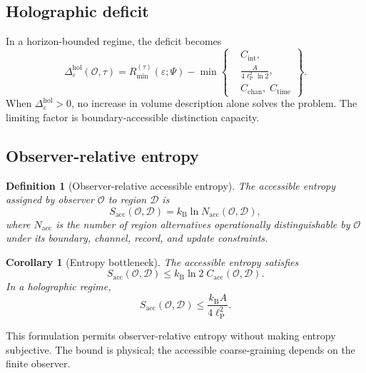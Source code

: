 \documentclass[10pt,a4paper,twocolumn,aps,prl]{revtex4-2}
\newtheorem{definition}{Definition}
\newtheorem{corollary}{Corollary}
\newcommand{\Obs}{\mathcal{O}}
\newcommand{\Patch}{\mathcal{D}}
\newcommand{\ellP}{\ell_{\mathrm P}}
\newcommand{\kB}{k_{\mathrm B}}
\begin{document}
\subsection{Holographic deficit}

In a horizon-bounded regime, the deficit becomes
\begin{equation}
\Delta_{\varepsilon}^{\mathrm{hol}}(\Obs,\tau)=R_{\min}^{(\tau)}(\varepsilon;\Psi)
-\min\!\left\{
\begin{aligned}
&C_{\mathrm{int}},\\
&\frac{A}{4\ellP^2\ln2},\\
&C_{\mathrm{chan}},\;C_{\mathrm{time}}
\end{aligned}
\right\}.
\end{equation}
When $\Delta_{\varepsilon}^{\mathrm{hol}}>0$, no increase in volume description alone solves the problem. The limiting factor is boundary-accessible distinction capacity.

\subsection{Observer-relative entropy}

\begin{definition}[Observer-relative accessible entropy]
The accessible entropy assigned by observer $\Obs$ to region $\Patch$ is
\begin{equation}
S_{\mathrm{acc}}(\Obs,\Patch)=\kB\ln N_{\mathrm{acc}}(\Obs,\Patch),
\end{equation}
where $N_{\mathrm{acc}}$ is the number of region alternatives operationally distinguishable by $\Obs$ under its boundary, channel, record, and update constraints.
\end{definition}

\begin{corollary}[Entropy bottleneck]
The accessible entropy satisfies
\begin{equation}
S_{\mathrm{acc}}(\Obs,\Patch)\leq \kB\ln2\; C_{\mathrm{acc}}(\Obs,\Patch).
\end{equation}
In a holographic regime,
\begin{equation}
S_{\mathrm{acc}}(\Obs,\Patch)\leq \frac{\kB A}{4\ellP^2}.
\end{equation}
\end{corollary}

This formulation permits observer-relative entropy without making entropy subjective. The bound is physical; the accessible coarse-graining depends on the finite observer.
\end{document}
